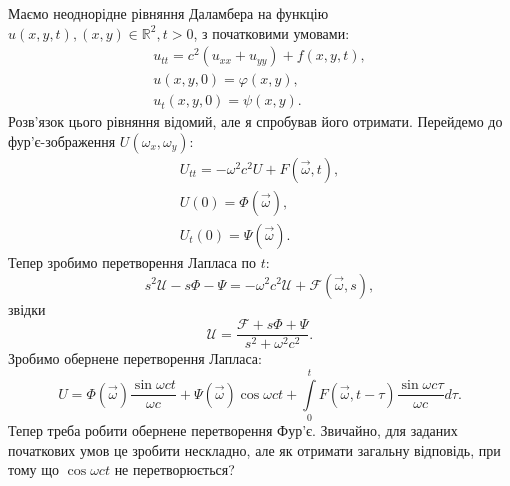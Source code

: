 \documentclass[14pt]{article}
\begin{document}
Маємо неоднорідне рівняння Даламбера на функцію $u(x,y,t), (x,y)\in \mathbb{R}^2, t>0$, з початковими умовами:
\begin{gather*}
  u_{tt}=c^2(u_{xx}+u_{yy})+f(x,y,t),\\
  u(x,y,0)=\varphi(x,y),\\
  u_t(x,y,0)=\psi(x,y).
\end{gather*}
Розв'язок цього рівняння відомий, але я спробував його отримати. Перейдемо до фур'є-зображення $U(\omega_x,\omega_y)$:
\begin{gather*}
  U_{tt}=-\omega^2 c^2 U+F(\vec{\omega},t),\\
  U(0)=\Phi(\vec{\omega}),\\
  U_t(0)=\Psi(\vec{\omega}).
\end{gather*}
Тепер зробимо перетворення Лапласа по $t$:
$$
  s^2 \mathcal{U}-s\Phi-\Psi=-\omega^2 c^2 \mathcal{U}+\mathcal{F}(\vec{\omega},s),
$$
звідки
$$
  \mathcal{U}=\frac{\mathcal{F}+s\Phi+\Psi}{s^2+\omega^2 c^2}.
$$
Зробимо обернене перетворення Лапласа:
$$
  U=\Phi(\vec{\omega})\frac{\sin\omega ct}{\omega c}+\Psi(\vec{\omega}) \cos \omega ct +\int\limits_0^t F(\vec{\omega},t-\tau)\frac{\sin \omega c\tau}{\omega c}d\tau.
$$
Тепер треба робити обернене перетворення Фур'є. Звичайно, для заданих початкових умов це зробити нескладно, але як отримати загальну відповідь, при тому що $\cos \omega ct$ не перетворюється?
\end{document}
